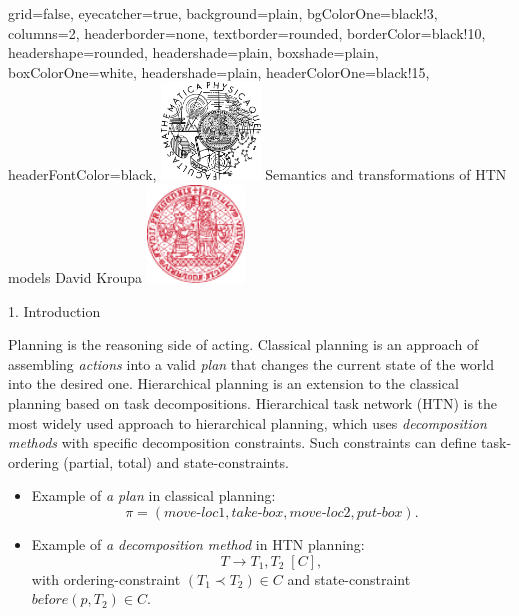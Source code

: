 \documentclass[portrait,a0paper,fontscale=0.25]{baposter}
\begin{document}
\color{black!80} %
\begin{poster}{grid=false,
	eyecatcher=true,
	background=plain,
	bgColorOne=black!3, %
	columns=2,
	headerborder=none,
        textborder=rounded, %
        borderColor=black!10,
	headershape=rounded, %
	headershade=plain,
	boxshade=plain,
	boxColorOne=white,
	headershade=plain,
	headerColorOne=black!15, %
	headerFontColor=black,
	}%
	{\includegraphics[height=7em]{logos/mff-black.pdf}}
	{Semantics and transformations of HTN models}
	{\vspace{1ex} David Kroupa}
	{\includegraphics[height=7em]{logos/uk-red.pdf}}


%
%

\begin{posterbox}[column=0,name=intro]{1. Introduction}

Planning is the reasoning side of acting. Classical planning is an approach of assembling \emph{actions} into a valid \emph{plan} that changes the current state of the world into the desired one. Hierarchical planning is an extension to the classical planning based on task decompositions. Hierarchical task network (HTN) is the most widely used approach to hierarchical planning, which uses \emph{decomposition methods} with specific decomposition constraints. Such constraints can define task-ordering (partial, total) and state-constraints.

\begin{itemize}
    \item Example of \emph{a plan} in classical planning:
    $$ \pi = (move\text{-}loc1, take\text{-}box, move\text{-}loc2, put\text{-}box). $$
    
    \item Example of \emph{a decomposition method} in HTN planning:
    $$ T \rightarrow T_1, T_2 \; [C],$$ with ordering-constraint $(T_1 \prec T_2) \in C$ and state-constraint $be\text{f}ore(p, T_2) \in C$.


\end{itemize}
\end{posterbox}
\end{poster}
\end{document}
